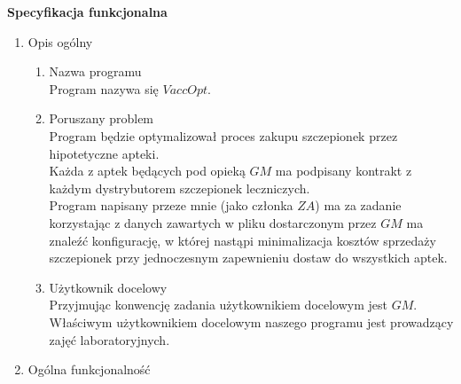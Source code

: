 \documentclass[11pt]{article}
\begin{document}
\begin{huge}
\begin{center}
\textbf{Specyfikacja funkcjonalna}
\end{center}
\end{huge}

 \renewcommand{\labelenumii}{\Roman{enumii}}
 \begin{enumerate}
 
 \item Opis ogólny
 
 \begin{enumerate}[label=\arabic{enumi}.\arabic*.]
 
 \item Nazwa programu\\
 Program nazywa się $VaccOpt$.
 \item Poruszany problem\\
 Program będzie optymalizował proces zakupu szczepionek przez hipotetyczne apteki.\\
 Każda z aptek będących pod opieką $GM$ ma podpisany kontrakt z każdym dystrybutorem szczepionek leczniczych.\\
 Program napisany przeze mnie (jako członka $ZA$) ma za zadanie korzystając z danych zawartych w pliku dostarczonym przez $GM$ ma znaleźć konfigurację, w której nastąpi minimalizacja kosztów sprzedaży szczepionek przy jednoczesnym zapewnieniu dostaw do wszystkich aptek.\\
 
 \item Użytkownik docelowy\\
 Przyjmując konwencję zadania użytkownikiem docelowym jest $GM$.\\
 Właściwym użytkownikiem docelowym naszego programu jest prowadzący zajęć laboratoryjnych.\\

 \end{enumerate}
 
 
 
\item Ogólna funkcjonalność


\end{enumerate}
\end{document}
